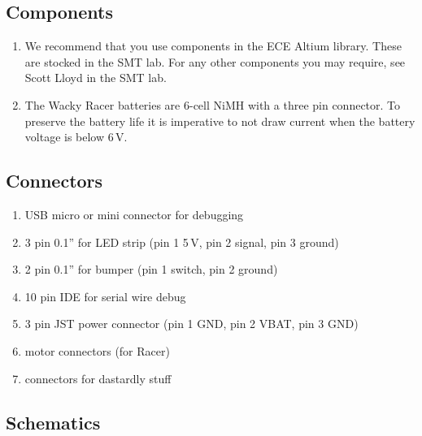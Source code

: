 \documentclass[11pt, a4paper]{article}
\begin{document}
\subsection{Components}

\begin{enumerate}
\item We recommend that you use components in the ECE Altium library.
  These are stocked in the SMT lab.  For any other components you may
  require, see Scott Lloyd in the SMT lab.

\item The Wacky Racer batteries are 6-cell NiMH with a three pin
  connector.  To preserve the battery life it is imperative to not
  draw current when the battery voltage is below 6\,V.
\end{enumerate}


\subsection{Connectors}

\begin{enumerate}
\item USB micro or mini connector for debugging
\item 3 pin 0.1'' for LED strip (pin 1 5\,V, pin 2 signal, pin 3 ground)
\item 2 pin 0.1'' for bumper (pin 1 switch, pin 2 ground)
\item 10 pin IDE for serial wire debug  
\item 3 pin JST power connector (pin 1 GND, pin 2 VBAT, pin 3 GND)
\item motor connectors (for Racer)
\item connectors for dastardly stuff
\end{enumerate}


\subsection{Schematics}
\end{document}

